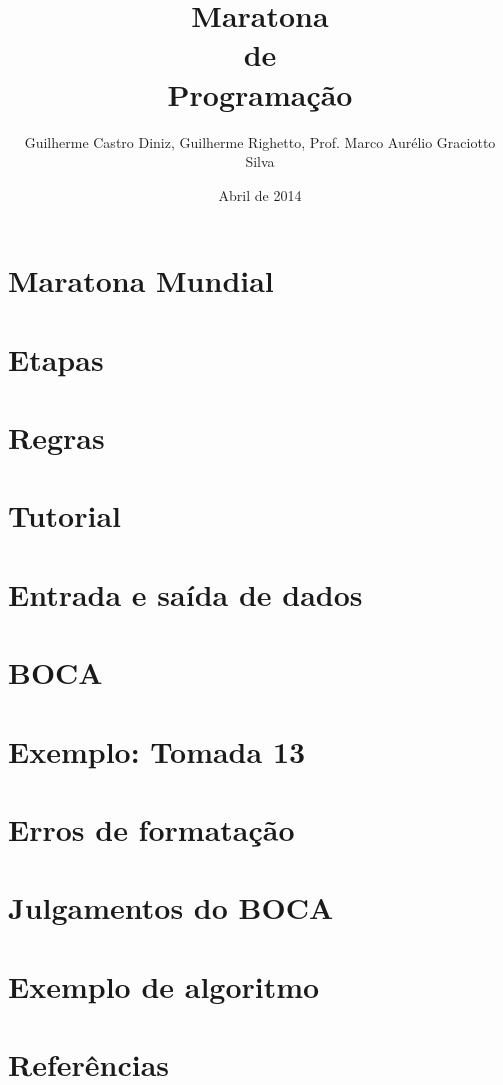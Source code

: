 \documentclass[utf8, usepdftitle=false, svgnames, color={table,
fixpdftex, hyperref, fixinclude, xcdraw}, t, brazil]{beamer}
\title{Maratona\\de\\Programação}
\author[UTFPR-CM]{Guilherme Castro Diniz, Guilherme Righetto, Prof. Marco Aurélio Graciotto Silva}
\date[]{Abril de 2014}
\begin{document}
 \frontmatter{}
 

 \section{Maratona Mundial}
 
 
 \section{Etapas}
 
 
 \section{Regras}
 
 
 \section{Tutorial}
 

 \section{Entrada e saída de dados}
 
 
 \section{BOCA}
 
 
 \section{Exemplo: Tomada 13}
 
 
 \section{Erros de formatação}
 
 
 \section{Julgamentos do BOCA}
 
 
 \section{Exemplo de algoritmo}
 
 
 \section{Referências}
 
\end{document}
